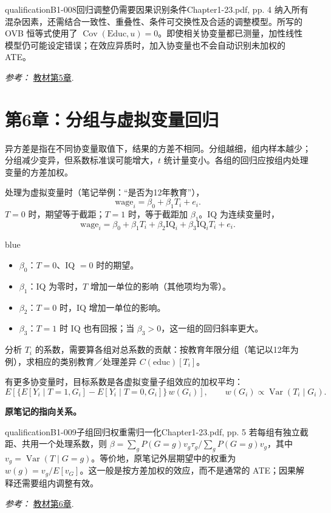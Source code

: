 {\begin{reviewnote}{qualification}{B1-008}{回归调整仍需要因果识别条件}{Chapter1-23.pdf, pp. 4}
纳入所有混杂因素，还需结合一致性、重叠性、条件可交换性及合适的调整模型。所写的 OVB 恒等式使用了 $\operatorname{Cov}(\mathrm{Educ},u)=0$。即使相关协变量都已测量，加性线性模型仍可能设定错误；在效应异质时，加入协变量也不会自动识别未加权的 ATE。
\par\smallskip\textit{参考：} \href{https://matheusfacure.github.io/python-causality-handbook/05-The-Unreasonable-Effectiveness-of-Linear-Regression.html}{教材第5章}.
\end{reviewnote}
\section{第6章：分组与虚拟变量回归}
异方差是指在不同协变量取值下，结果的方差不相同。分组越细，组内样本越少；分组减少变异，但系数标准误可能增大，$t$ 统计量变小。各组的回归应按组内处理变量的方差加权。

处理为虚拟变量时（笔记举例：“是否为12年教育”），
\[\mathrm{wage}_i=\beta_0+\beta_1T_i+e_i.\]
$T=0$ 时，期望等于截距；$T=1$ 时，等于截距加 $\beta_1$。IQ 为连续变量时，
\[\mathrm{wage}_i=\beta_0+\beta_1T_i+\beta_2\mathrm{IQ}_i+\beta_3\mathrm{IQ}_iT_i+e_i.\]
\begin{inkblock}{blue}
\begin{itemize}
\item $\beta_0$：$T=0$、IQ $=0$ 时的期望。
\item $\beta_1$：IQ 为零时，$T$ 增加一单位的影响（其他项均为零）。
\item $\beta_2$：$T=0$ 时，IQ 增加一单位的影响。
\item $\beta_3$：$T=1$ 时 IQ 也有回报；当 $\beta_3>0$，这一组的回归斜率更大。
\end{itemize}
\end{inkblock}
分析 $T_i$ 的系数，需要算各组对总系数的贡献：按教育年限分组（笔记以12年为例），求相应的类别教育／处理差异 $C(\mathrm{educ})[T_i]$。

有更多协变量时，目标系数是各虚拟变量子组效应的加权平均：
\[E\!\left[\{E[Y_i\mid T=1,G_i]-E[Y_i\mid T=0,G_i]\}\,w(G_i)\right],\qquad
w(G_i)\propto\operatorname{Var}(T_i\mid G_i).
\]

\par{}\smallskip\textbf{原笔记的指向关系。}\par\smallskip
{}
\begin{reviewnote}{qualification}{B1-009}{子组回归权重需归一化}{Chapter1-23.pdf, pp. 5}
若每组有独立截距、共用一个处理系数，则 $\beta=\sum_g P(G=g)v_g\tau_g/\sum_gP(G=g)v_g$，其中 $v_g=\operatorname{Var}(T\mid G=g)$。等价地，原笔记外层期望中的权重为 $w(g)=v_g/E[v_G]$。这一般是按方差加权的效应，而不是通常的 ATE；因果解释还需要组内调整有效。
\par\smallskip\textit{参考：} \href{https://matheusfacure.github.io/python-causality-handbook/06-Grouped-and-Dummy-Regression.html}{教材第6章}.
\end{reviewnote}
}
